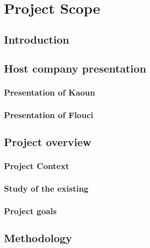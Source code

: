 \setcounter{mtc}{5} %
\chapter{Project Scope}
\minitoc  %

\graphicspath{{Chapitre1/figures/}}
\pagestyle{fancy}
\fancyhf{}
\fancyhead[R]{\bfseries\rightmark}
\fancyfoot[R]{\thepage}
\renewcommand{\headrulewidth}{0.5pt}
\renewcommand{\footrulewidth}{0pt}
\renewcommand{\chaptermark}[1]{\markboth{\MakeUppercase{\chaptername~\thechapter. #1 }}{}}
\renewcommand{\sectionmark}[1]{\markright{\thechapter.\thesection~ #1}}

\begin{spacing}{1.2}

\section*{Introduction}
\section{Host company presentation} 
\subsection{Presentation of Kaoun}
\subsection{Presentation of Flouci}
\section{Project overview}
\subsection{Project Context}
\subsection{Study of the existing}
\subsection{Project goals}
\section{Methodology}

\end{spacing}
